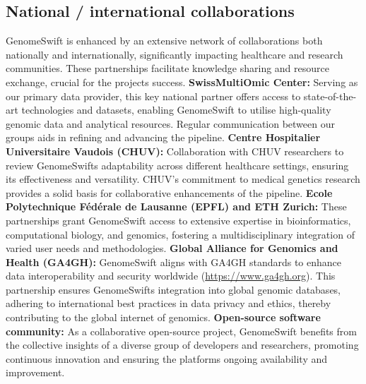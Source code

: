 \subsection{National / international collaborations}

GenomeSwift is enhanced by an extensive network of collaborations both
nationally and internationally, significantly impacting healthcare and
research communities. These partnerships facilitate knowledge sharing
and resource exchange, crucial for the project\textquotesingle s
success. \textbf{SwissMultiOmic Center:} Serving as our primary data
provider, this key national partner offers access to state-of-the-art
technologies and datasets, enabling GenomeSwift to utilise high-quality
genomic data and analytical resources. Regular communication between our
groups aids in refining and advancing the pipeline. \textbf{Centre
Hospitalier Universitaire Vaudois (CHUV):} Collaboration with CHUV
researchers to review GenomeSwift\textquotesingle s adaptability across
different healthcare settings, ensuring its effectiveness and
versatility. CHUV's commitment to medical genetics research provides a
solid basis for collaborative enhancements of the pipeline.
\textbf{Ecole Polytechnique Fédérale de Lausanne (EPFL) and ETH Zurich:}
These partnerships grant GenomeSwift access to extensive expertise in
bioinformatics, computational biology, and genomics, fostering a
multidisciplinary integration of varied user needs and methodologies.
\textbf{Global Alliance for Genomics and Health (GA4GH):} GenomeSwift
aligns with GA4GH standards to enhance data interoperability and
security worldwide (\url{https://www.ga4gh.org}). This partnership
ensures GenomeSwift\textquotesingle s integration into global genomic
databases, adhering to international best practices in data privacy and
ethics, thereby contributing to the global \textquotesingle internet of
genomics\textquotesingle. \textbf{Open-source software community:} As a
collaborative open-source project, GenomeSwift benefits from the
collective insights of a diverse group of developers and researchers,
promoting continuous innovation and ensuring the
platform\textquotesingle s ongoing availability and improvement.